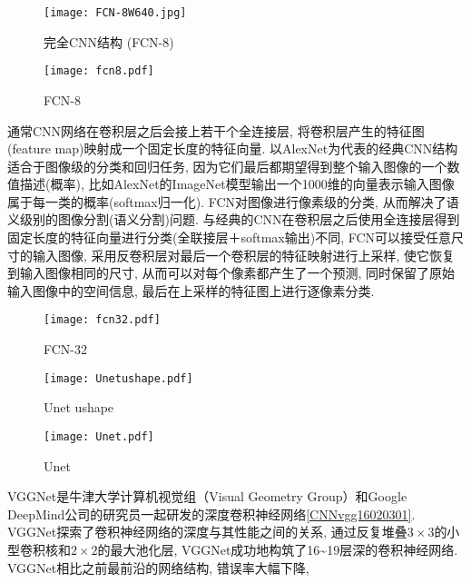 \begin{figure}[H]
\centering
\texttt{[image: FCN-8W640.jpg]}
\caption{完全CNN结构 (FCN-8)\cite{PiramanayagamSaber2018-9591}}
\label{FCN-8W640}\vspace{-0.4cm}
\end{figure}
\begin{figure}[H]
\centering
\texttt{[image: fcn8.pdf]}
\caption{FCN-8}
\label{CNNfcn80203}\vspace{-0.4cm}
\end{figure}
通常CNN网络在卷积层之后会接上若干个全连接层, 将卷积层产生的特征图(feature map)映射成一个固定长度的特征向量. 以AlexNet为代表的经典CNN结构适合于图像级的分类和回归任务, 因为它们最后都期望得到整个输入图像的一个数值描述(概率), 比如AlexNet的ImageNet模型输出一个1000维的向量表示输入图像属于每一类的概率(softmax归一化). FCN对图像进行像素级的分类, 从而解决了语义级别的图像分割(语义分割)问题. 与经典的CNN在卷积层之后使用全连接层得到固定长度的特征向量进行分类(全联接层＋softmax输出)不同, FCN可以接受任意尺寸的输入图像, 采用反卷积层对最后一个卷积层的特征映射进行上采样, 使它恢复到输入图像相同的尺寸, 从而可以对每个像素都产生了一个预测, 同时保留了原始输入图像中的空间信息, 最后在上采样的特征图上进行逐像素分类.
\begin{figure}[H]
\centering
\texttt{[image: fcn32.pdf]}
\caption{FCN-32}
\label{CNNfcn320203}\vspace{-0.4cm}
\end{figure}
\begin{figure}[H]
\centering
\texttt{[image: Unetushape.pdf]}
\caption{Unet ushape}
\label{CNNUnetushape0203}\vspace{-0.4cm}
\end{figure}
\begin{figure}[H]
\centering
\texttt{[image: Unet.pdf]}
\caption{Unet}
\label{CNNUnet0203}\vspace{-0.4cm}
\end{figure}
VGGNet是牛津大学计算机视觉组（Visual Geometry Group）和Google DeepMind公司的研究员一起研发的深度卷积神经网络\ref{CNNvgg16020301}.
VGGNet探索了卷积神经网络的深度与其性能之间的关系, 通过反复堆叠$3\times 3$的小型卷积核和$2\times 2$的最大池化层,
VGGNet成功地构筑了16\textasciitilde 19层深的卷积神经网络. VGGNet相比之前最前沿的网络结构, 错误率大幅下降,
